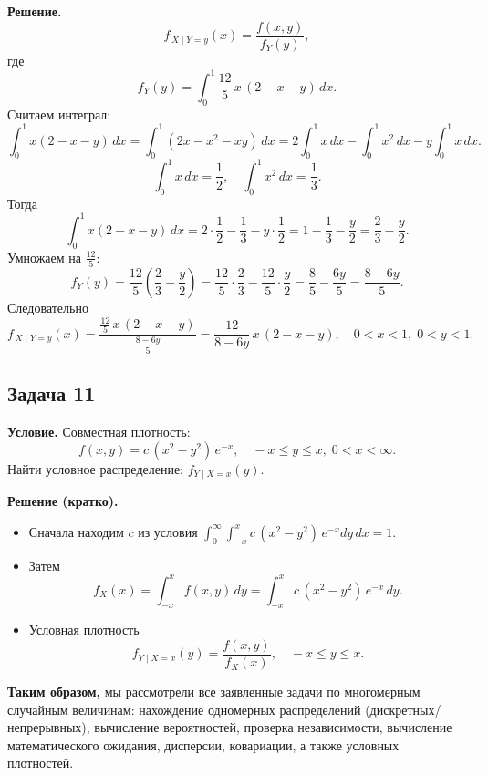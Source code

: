\documentclass[12pt]{article}
\begin{document}
\textbf{Решение.}  
\[
f_{\,X\mid Y=y}(x) = \frac{f(x,y)}{f_Y(y)},
\]
где
\[
f_Y(y)=\int_{0}^{1}\frac{12}{5}\,x\,(2-x-y)\,dx.
\]
Считаем интеграл:
\[
\int_{0}^{1} x(2 - x - y)\,dx
= \int_0^1 (2x - x^2 - x y)\,dx
=2\int_0^1 x\,dx -\int_0^1 x^2\,dx -y\int_0^1 x\,dx.
\]
\[
\int_0^1 x\,dx=\frac12,\quad \int_0^1 x^2\,dx=\frac13.
\]
Тогда
\[
\int_0^1 x(2-x-y)\,dx = 2\cdot\frac12 - \frac13 -y\cdot\frac12
=1-\frac13-\frac{y}{2}
=\frac23-\frac{y}{2}.
\]
Умножаем на \(\tfrac{12}{5}\):
\[
f_Y(y)=\frac{12}{5}\left(\frac23-\frac{y}{2}\right)
=\frac{12}{5}\cdot \frac23 - \frac{12}{5}\cdot \frac{y}{2}
=\frac{8}{5}-\frac{6y}{5}
=\frac{8-6y}{5}.
\]
Следовательно
\[
f_{\,X\mid Y=y}(x)=\frac{\frac{12}{5}\,x\,(2-x-y)}{\frac{8-6y}{5}}
=\frac{12}{8-6y}\,x\,(2-x-y),\quad 0<x<1,\;0<y<1.
\]

\subsection*{Задача 11}
\textbf{Условие.} Совместная плотность:
\[
f(x,y) = c\,(x^2 - y^2)\,e^{-x},\quad -x\le y\le x,\;0<x<\infty.
\]
Найти условное распределение: \(f_{Y\mid X=x}(y)\).

\textbf{Решение (кратко).}
\begin{itemize}
\item Сначала находим \(c\) из условия \(\int_0^\infty \int_{-x}^x c\,(x^2-y^2)\,e^{-x}dy\,dx=1.\)
\item Затем
\[
f_X(x)=\int_{-x}^x f(x,y)\,dy = \int_{-x}^x c\,(x^2-y^2)\,e^{-x}\,dy.
\]
\item Условная плотность
\[
f_{Y\mid X=x}(y) = \frac{f(x,y)}{f_X(x)},\quad -x\le y \le x.
\]
\end{itemize}

\vspace{1em}

\textbf{Таким образом,} мы рассмотрели все заявленные задачи по многомерным случайным величинам: нахождение одномерных распределений (дискретных/непрерывных), вычисление вероятностей, проверка независимости, вычисление математического ожидания, дисперсии, ковариации, а также условных плотностей. 
\end{document}
